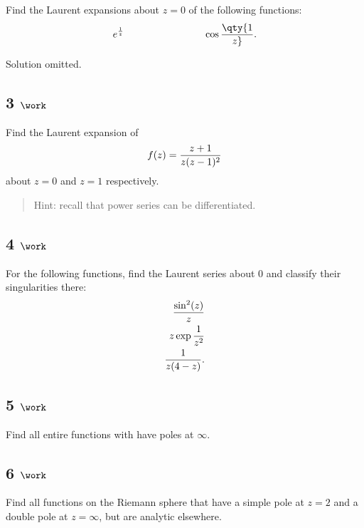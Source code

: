 Find the Laurent expansions about \(z=0\) of the following functions:
\begin{align*}
e^{1\over z} \hspace{8em} \cos \qty{1\over z}
.\end{align*}

Solution omitted.

\hypertarget{work-30}{%
\subsection{\texorpdfstring{3
\(\work\)}{3 \textbackslash work}}\label{work-30}}

Find the Laurent expansion of
\begin{align*}
f(z) = {z+1 \over z(z-1)^2}
\end{align*}
about \(z=0\) and \(z=1\) respectively.

\begin{quote}
Hint: recall that power series can be differentiated.
\end{quote}

\hypertarget{work-31}{%
\subsection{\texorpdfstring{4
\(\work\)}{4 \textbackslash work}}\label{work-31}}

For the following functions, find the Laurent series about \(0\) and
classify their singularities there:
\begin{align*}
{\sin^2(z) \over z} \\
z \exp{1\over z^2} \\
{1 \over z(4-z)}
.\end{align*}

\hypertarget{work-32}{%
\subsection{\texorpdfstring{5
\(\work\)}{5 \textbackslash work}}\label{work-32}}

Find all entire functions with have poles at \(\infty\).

\hypertarget{work-33}{%
\subsection{\texorpdfstring{6
\(\work\)}{6 \textbackslash work}}\label{work-33}}

Find all functions on the Riemann sphere that have a simple pole at
\(z=2\) and a double pole at \(z=\infty\), but are analytic elsewhere.


